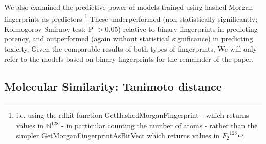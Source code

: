 \documentclass{article}
\begin{document}
We also examined the predictive power of models trained using hashed Morgan fingerprints as predictors \footnote{i.e. using the rdkit function GetHashedMorganFingerprint - which returns values in $\mathbb{N}^{128}$ - in particular counting the number of atoms - rather than the simpler GetMorganFingerprintAsBitVect which returns values in ${F_2}^{128}$}  These underperformed (non statistically significantly; Kolmogorov-Smirnov test; P $>$0.05) relative to binary fingerprints in predicting potency, and outperformed (again without statistical significance) in predicting toxicity.  
Given the comparable results of both types of fingerprints, We will only refer to the models based on binary fingerprints for the remainder of the paper.
\newline
\newline



\subsection{Molecular Similarity: Tanimoto distance}
\end{document}

